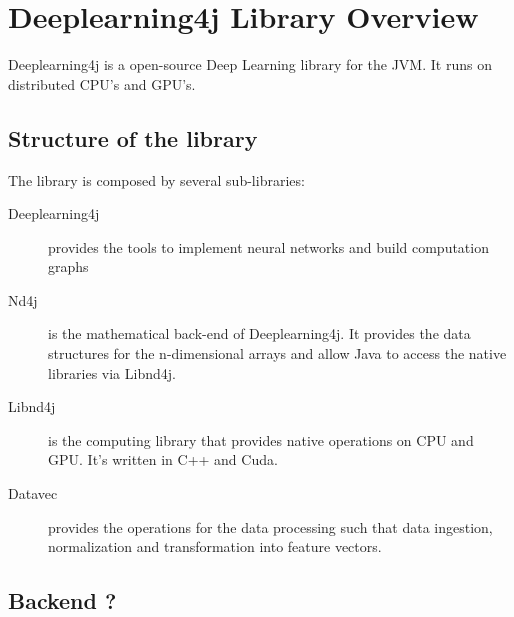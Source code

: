 \chapter{Deeplearning4j Library Overview}

Deeplearning4j is a open-source Deep Learning library for the {JVM}. It runs on distributed CPU's and GPU's.

\section{Structure of the library}
The library is composed by several sub-libraries:

\begin{description}
	\item [Deeplearning4j] provides the tools to implement neural networks and build computation graphs
	\item [Nd4j] is the mathematical back-end of Deeplearning4j. It provides the data structures for the n-dimensional arrays and allow Java to access the native libraries via Libnd4j.
	\item [Libnd4j] is the computing library that provides native operations on CPU and GPU. It's written in C++ and Cuda.
	\item [Datavec] provides the operations for the data processing such that data ingestion, normalization and transformation into feature vectors.
\end{description}

\section{Backend ?}